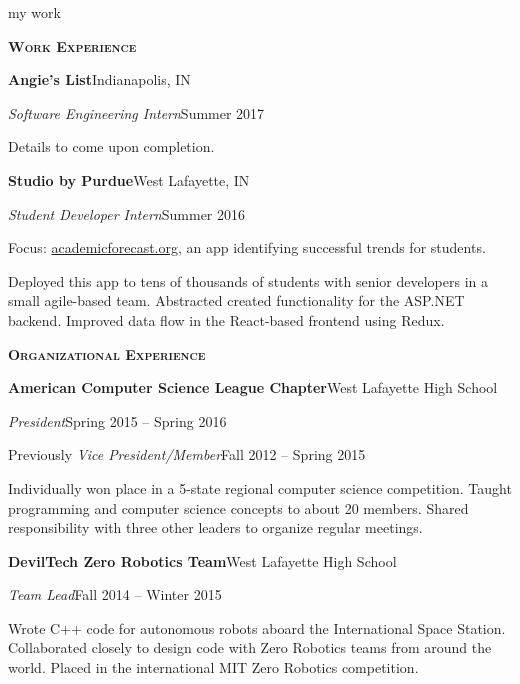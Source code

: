 \documentclass[11pt]{article}
\newcommand{\sectionfont}{\Large\scshape\bfseries\color{cg505green}}
\newcommand{\impact}[1]{\textcolor{cg505green}{\nohyphens{#1}}}
\begin{document}
\begin{minipage}[t]{0.67\textwidth}
  {\Huge\color{black} my work \phantom{me}}

  \vspace{5pt}

  {\sectionfont Work Experience}

  \textbf{Angie's List}\hfill Indianapolis, IN
  \begin{adjustwidth}{10pt}{}
    \emph{Software Engineering Intern}\hfill Summer 2017

    Details to come upon completion.
  \end{adjustwidth}

  \textbf{Studio by Purdue}\hfill West Lafayette, IN
  \begin{adjustwidth}{10pt}{}
    \emph{Student Developer Intern}\hfill Summer 2016

    Focus: \href{https://academicforecast.org/about/}{academicforecast.org}, an app identifying successful trends for students.

    \impact{Deployed this app to tens of thousands} of students with senior developers in a small agile-based team.
    Abstracted created functionality for the ASP.NET backend.
    Improved data flow in the React-based frontend using Redux.
  \end{adjustwidth}

  \vspace{5pt}

  {\sectionfont Organizational Experience}

  \textbf{American Computer Science League Chapter}\hfill West Lafayette High School
  \begin{adjustwidth}{10pt}{}
    \emph{President}\hfill Spring 2015 -- Spring 2016

    Previously \emph{Vice President/Member}\hfill Fall 2012 -- Spring 2015

    Individually \impact{won  place} in a 5-state regional computer science competition.
    Taught programming and computer science concepts to about 20 members.
    Shared responsibility with three other leaders to organize regular meetings.
  \end{adjustwidth}

  \textbf{DevilTech Zero Robotics Team}\hfill West Lafayette High School
  \begin{adjustwidth}{10pt}{}
    \emph{Team Lead}\hfill Fall 2014 -- Winter 2015

    Wrote C++ code for \impact{autonomous robots aboard the International Space Station}.
    Collaborated closely to design code with Zero Robotics teams from \impact{around the world}.
    \impact{Placed } in the international MIT Zero Robotics competition.
  \end{adjustwidth}


\end{minipage}
\end{document}
